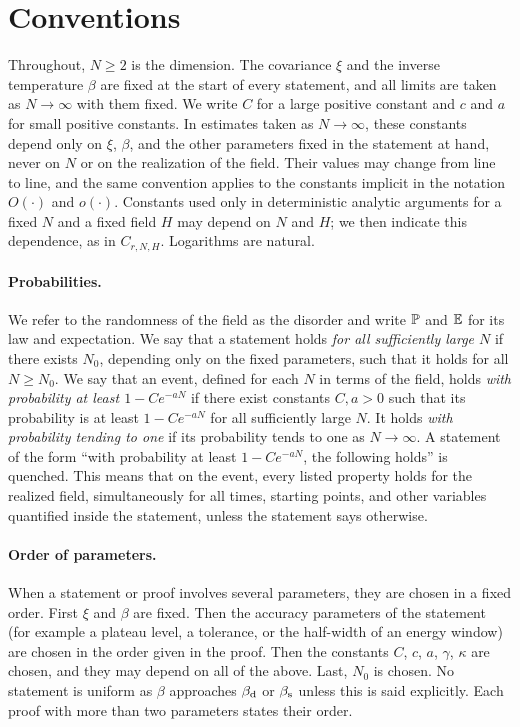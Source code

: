 \section{Conventions}\label{sec:pre-conventions}

Throughout, $N\ge2$ is the dimension. The covariance $\xi$ and the inverse temperature $\beta$ are fixed at the start of every statement, and all limits are taken as $N\to\infty$ with them fixed. We write $C$ for a large positive constant and $c$ and $a$ for small positive constants. In estimates taken as $N\to\infty$, these constants depend only on $\xi$, $\beta$, and the other parameters fixed in the statement at hand, never on $N$ or on the realization of the field. Their values may change from line to line, and the same convention applies to the constants implicit in the notation $O(\cdot)$ and $o(\cdot)$. Constants used only in deterministic analytic arguments for a fixed $N$ and a fixed field $H$ may depend on $N$ and $H$; we then indicate this dependence, as in $C_{r,N,H}$. Logarithms are natural.

\paragraph{Probabilities.} We refer to the randomness of the field as the disorder and write $\mathbb P$ and $\mathbb E$ for its law and expectation. We say that a statement holds \emph{for all sufficiently large $N$} if there exists $N_0$, depending only on the fixed parameters, such that it holds for all $N\ge N_0$. We say that an event, defined for each $N$ in terms of the field, holds \emph{with probability at least $1-Ce^{-aN}$} if there exist constants $C,a>0$ such that its probability is at least $1-Ce^{-aN}$ for all sufficiently large $N$. It holds \emph{with probability tending to one} if its probability tends to one as $N\to\infty$. A statement of the form ``with probability at least $1-Ce^{-aN}$, the following holds'' is quenched. This means that on the event, every listed property holds for the realized field, simultaneously for all times, starting points, and other variables quantified inside the statement, unless the statement says otherwise.

\paragraph{Order of parameters.} When a statement or proof involves several parameters, they are chosen in a fixed order. First $\xi$ and $\beta$ are fixed. Then the accuracy parameters of the statement (for example a plateau level, a tolerance, or the half-width of an energy window) are chosen in the order given in the proof. Then the constants $C$, $c$, $a$, $\gamma$, $\kappa$ are chosen, and they may depend on all of the above. Last, $N_0$ is chosen. No statement is uniform as $\beta$ approaches $\beta_{\mathrm d}$ or $\beta_{\mathrm s}$ unless this is said explicitly. Each proof with more than two parameters states their order.

